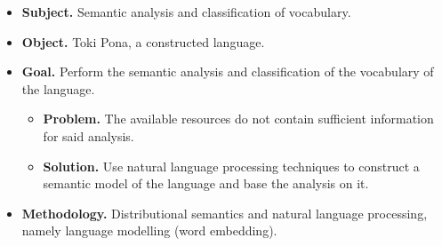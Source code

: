 \documentclass[14pt, a4paper]{extreport}
\begin{document}





\begin{itemize}
  \item \textbf{Subject.} Semantic analysis and classification of vocabulary.
  \item \textbf{Object.} Toki Pona, a constructed language.
  \item \textbf{Goal.} Perform the semantic analysis and classification of the vocabulary of the language.
  \begin{itemize}
    \item \textbf{Problem.} The available resources do not contain sufficient information for said analysis.
    \item \textbf{Solution.} Use natural language processing techniques to construct a semantic model of the language and base the analysis on it.
  \end{itemize}
  \item \textbf{Methodology.} Distributional semantics and natural language processing, namely language modelling (word embedding).
\end{itemize}
\end{document}
